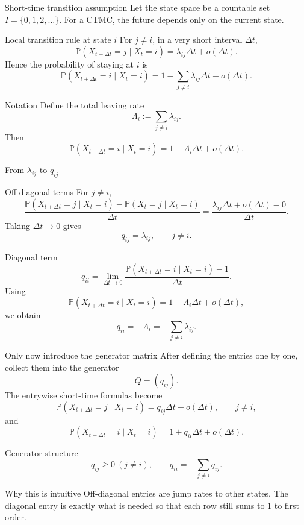 \documentclass[aspectratio=169,professionalfonts]{beamer}
\newcommand{\Prob}{\mathbb{P}}
\begin{document}
\begin{frame}{Short-time transition assumption}
\small
Let the state space be a countable set $I=\{0,1,2,\dots\}$.
For a CTMC, the future depends only on the current state.

\vspace{0.15cm}
\begin{block}{Local transition rule at state $i$}
For $j\neq i$, in a very short interval $\Delta t$,
\[
\Prob(X_{t+\Delta t}=j\mid X_t=i)=\lambda_{ij}\Delta t+o(\Delta t).
\]
Hence the probability of staying at $i$ is
\[
\Prob(X_{t+\Delta t}=i\mid X_t=i)
=1-\sum_{j\neq i}\lambda_{ij}\Delta t+o(\Delta t).
\]
\end{block}

\begin{alertblock}{Notation}
Define the total leaving rate
\[
\Lambda_i:=\sum_{j\neq i}\lambda_{ij}.
\]
Then
\[
\Prob(X_{t+\Delta t}=i\mid X_t=i)=1-\Lambda_i\Delta t+o(\Delta t).
\]
\end{alertblock}
\end{frame}

\begin{frame}{From $\lambda_{ij}$ to $q_{ij}$}
\scriptsize
\begin{block}{Off-diagonal terms}
For $j\neq i$,
\[
\frac{\Prob(X_{t+\Delta t}=j\mid X_t=i)-\Prob(X_t=j\mid X_t=i)}{\Delta t}
=\frac{\lambda_{ij}\Delta t+o(\Delta t)-0}{\Delta t}.
\]
Taking $\Delta t\to 0$ gives
\[
q_{ij}=\lambda_{ij},\qquad j\neq i.
\]
\end{block}

\begin{alertblock}{Diagonal term}
\[
q_{ii}
=\lim_{\Delta t\to 0}
\frac{\Prob(X_{t+\Delta t}=i\mid X_t=i)-1}{\Delta t}.
\]
Using
\[
\Prob(X_{t+\Delta t}=i\mid X_t=i)=1-\Lambda_i\Delta t+o(\Delta t),
\]
we obtain
\[
q_{ii}=-\Lambda_i=-\sum_{j\neq i}\lambda_{ij}.
\]
\end{alertblock}
\end{frame}

\begin{frame}{Only now introduce the generator matrix}
\scriptsize
After defining the entries one by one, collect them into the generator
\[
Q=(q_{ij}).
\]
The entrywise short-time formulas become
\[
\Prob(X_{t+\Delta t}=j\mid X_t=i)=q_{ij}\Delta t+o(\Delta t),\qquad j\neq i,
\]
and
\[
\Prob(X_{t+\Delta t}=i\mid X_t=i)=1+q_{ii}\Delta t+o(\Delta t).
\]

\begin{block}{Generator structure}
\[
q_{ij}\ge 0\ (j\neq i),\qquad
q_{ii}=-\sum_{j\neq i}q_{ij}.
\]
\end{block}

\begin{alertblock}{Why this is intuitive}
Off-diagonal entries are jump rates to other states. The diagonal entry is exactly what is needed so that each row still sums to $1$ to first order.
\end{alertblock}
\end{frame}
\end{document}
